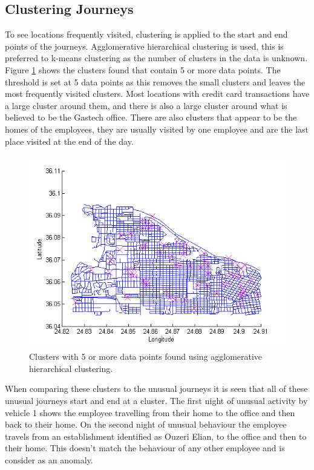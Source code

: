 \subsection{Clustering Journeys}
\label{sec:clusteringjourneys}

\noindent To see locations frequently visited, clustering is applied to the start and end points of the journeys. Agglomerative hierarchical clustering is used, this is preferred to k-means clustering as the number of clusters in the data is unknown. Figure \ref{fig:Clustering} shows the clusters found that contain 5 or more data points. The threshold is set at 5 data points as this removes the small clusters and leaves the most frequently visited clusters. Most locations with credit card transactions have a large cluster around them, and there is also a large cluster around what is believed to be the Gastech office. There are also clusters that appear to be the homes of the employees, they are usually visited by one employee and are the last place visited at the end of the day. \\

\begin{figure}[H]
\centering
\includegraphics[width=1.1\textwidth]{Clustering.png}
\caption{\label{fig:Clustering}Clusters with 5 or more data points found using agglomerative hierarchical clustering.}
\end{figure}

\noindent When comparing these clusters to the unusual journeys it is seen that all of these unusual journeys start and end at a cluster. The first night of unusual activity by vehicle 1 shows the employee travelling from their home to the office and then back to their home. On the second night of unusual behaviour the employee travels from an establishment identified as Ouzeri Elian, to the office and then to their home. This doesn’t match the behaviour of any other employee and is consider as an anomaly.\\

